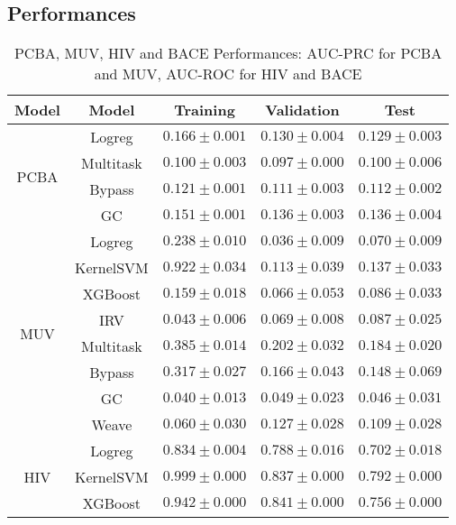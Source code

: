 \subsection{Performances}
\begin{table}[H]
    \small
    \centering
    \caption{PCBA, MUV, HIV and BACE Performances: AUC-PRC for PCBA and MUV, AUC-ROC for HIV and BACE }
    \begin{tabular}{ |c|c|c|c|c| } 
    \hline
    \textbf{Model} & \textbf{Model} & \textbf{Training} & \textbf{Validation} & \textbf{Test} \\
    \hline
    \hline    
    \multirow{4}{*}{PCBA}
    & Logreg & $0.166\pm0.001$ & $0.130\pm0.004$ & $0.129\pm0.003$ \\\cline{2-5}
    & Multitask & $0.100\pm0.003$ & $0.097\pm0.000$ & $0.100\pm0.006$ \\\cline{2-5}
    & Bypass & $0.121\pm0.001$ & $0.111\pm0.003$ & $0.112\pm0.002$ \\\cline{2-5}
    & GC & $0.151\pm0.001$ & $\mathbf{0.136\pm0.003}$ & $\mathbf{0.136\pm0.004}$ \\\cline{2-5}
    \hline
    \hline    
    \multirow{8}{*}{MUV}
    & Logreg & $0.238\pm0.010$ & $0.036\pm0.009$ & $0.070\pm0.009$ \\\cline{2-5}
    & KernelSVM & $0.922\pm0.034$ & $0.113\pm0.039$ & $0.137\pm0.033$ \\\cline{2-5}
    & XGBoost & $0.159\pm0.018$ & $0.066\pm0.053$ & $0.086\pm0.033$ \\\cline{2-5}
    & IRV & $0.043\pm0.006$ & $0.069\pm0.008$ & $0.087\pm0.025$ \\\cline{2-5}
    & Multitask & $0.385\pm0.014$ & $\mathbf{0.202\pm0.032}$ & $\mathbf{0.184\pm0.020}$ \\\cline{2-5}
    & Bypass & $0.317\pm0.027$ & $0.166\pm0.043$ & $0.148\pm0.069$ \\\cline{2-5}
    & GC & $0.040\pm0.013$ & $0.049\pm0.023$ & $0.046\pm0.031$ \\\cline{2-5}
    & Weave & $0.060\pm0.030$ & $0.127\pm0.028$ & $0.109\pm0.028$ \\\cline{2-5}
    \hline
    \hline    
    \multirow{8}{*}{HIV}
    & Logreg & $0.834\pm0.004$ & $0.788\pm0.016$ & $0.702\pm0.018$ \\\cline{2-5}
    & KernelSVM & $0.999\pm0.000$ & $0.837\pm0.000$ & $\mathbf{0.792\pm0.000}$ \\\cline{2-5}
    & XGBoost & $0.942\pm0.000$ & $\mathbf{0.841\pm0.000}$ & $0.756\pm0.000$ \\\cline{2-5}

\end{tabular}
\end{table}
